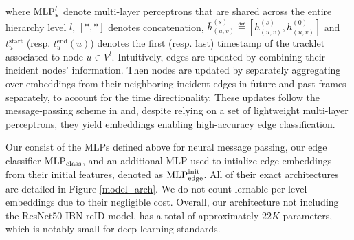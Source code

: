 \documentclass[10pt,twocolumn,letterpaper]{article}
\begin{document}
{{\iffalse
\begin{align}
&(\text{Edge Update}) &h_{(u, v)}^{(s)} &=  \mlp^l_{\text{edge}}\left( \left[ h_{u}^{(s-1)}, \bar{h}_{(u, v)}^{(s-1)}, h_{v}^{(s-1)} \right] \right) \\  
&(\text{Message Computation})            &m_{u\rightarrow v}^{(s)} &=\begin{cases} 
            \mlp^l_{\text{past}}\left([h_u^{(s-1)}, \bar{h}_{(u, v)}^{(s)}, h_{v}^{(s-1)}]\right) \text{if } \text{end}(u)<\text{start}(v),\\[7pt]
            \mlp^l_{\text{future}} \text{ }\left([h_u^{(s-1)}, \bar{h}_{(u, v)}^{(s)}, h_{v}^{(s-1)}]\right) \text{otherwise}.  
          \end{cases}\\
&(\text{Node Update})            &h_v^{(s)} &=  \mlp^l_{\text{node}}\left ( \left [ \sum_{u| \text{end}(u)<\text{start}(v)} m^{(s)}_{u\rightarrow v},\sum_{u| \text{start}(u)>\text{end}(v)} m^{(s)}_{    u\rightarrow v} \right ] \right ). 
\end{align}
\fi





where ${\text{MLP}}^l_*$ denote multi-layer perceptrons that are shared across the entire hierarchy level $l$, $[*, *]$ denotes concatenation, $\bar{h}^{(s)}_{(u, v)}\eqdef  [h^{(s)}_{(u, v)}, h^{(0)}_{(u, v)}]$ and $t_u^\text{start}$ (resp. $t_u^\text{end}(u)$) denotes the first (resp. last) timestamp of the tracklet associated to node $u\in V^l$.
Intuitively, edges are updated by combining their incident nodes' information. Then nodes are updated by separately aggregating over embeddings from their neighboring incident edges in future and past frames separately, to account for the time directionality. These updates follow the message-passing scheme in \cite{mpntrack} and, despite relying on a set of lightweight multi-layer perceptrons, they yield embeddings enabling high-accuracy edge classification.


 Our \blocknameplural consist of the MLPs defined above for neural message passing, our edge classifier ${\text{MLP}}_{\text{class}}$, and an additional MLP used to intialize edge embeddings from their initial features, denoted as ${\text{MLP}}^{\text{init}}_{\text{edge}}$. All of their exact architectures are detailed in Figure \ref{model_arch}. We do not count lernable per-level embeddings due to their negligible cost. Overall, our architecture not including the ResNet50-IBN reID model, has a total of approximately $22K$ parameters, which is notably small for deep learning standards.

}}
\end{document}

